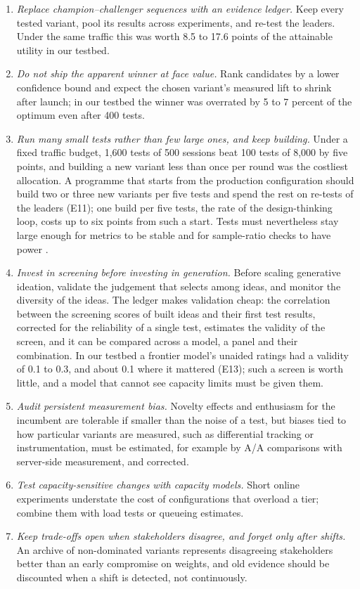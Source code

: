 \documentclass[preprint,12pt,authoryear]{elsarticle}
\theoremstyle{definition}
\begin{document}
\begin{enumerate}[leftmargin=*,itemsep=2pt]
\item \emph{Replace champion--challenger sequences with an evidence ledger.} Keep every tested variant, pool its results across experiments, and re-test the leaders. Under the same traffic this was worth 8.5 to 17.6 points of the attainable utility in our testbed.
\item \emph{Do not ship the apparent winner at face value.} Rank candidates by a lower confidence bound and expect the chosen variant's measured lift to shrink after launch; in our testbed the winner was overrated by 5 to 7 percent of the optimum even after 400 tests.
\item \emph{Run many small tests rather than few large ones, and keep building.} Under a fixed traffic budget, 1,600 tests of 500 sessions beat 100 tests of 8,000 by five points, and building a new variant less than once per round was the costliest allocation. A programme that starts from the production configuration should build two or three new variants per five tests and spend the rest on re-tests of the leaders (E11); one build per five tests, the rate of the design-thinking loop, costs up to six points from such a start. Tests must nevertheless stay large enough for metrics to be stable and for sample-ratio checks to have power \citep{fabijan2019}.
\item \emph{Invest in screening before investing in generation.} Before scaling generative ideation, validate the judgement that selects among ideas, and monitor the diversity of the ideas. The ledger makes validation cheap: the correlation between the screening scores of built ideas and their first test results, corrected for the reliability of a single test, estimates the validity of the screen, and it can be compared across a model, a panel and their combination. In our testbed a frontier model's unaided ratings had a validity of 0.1 to 0.3, and about 0.1 where it mattered (E13); such a screen is worth little, and a model that cannot see capacity limits must be given them.
\item \emph{Audit persistent measurement bias.} Novelty effects and enthusiasm for the incumbent are tolerable if smaller than the noise of a test, but biases tied to how particular variants are measured, such as differential tracking or instrumentation, must be estimated, for example by A/A comparisons with server-side measurement, and corrected.
\item \emph{Test capacity-sensitive changes with capacity models.} Short online experiments understate the cost of configurations that overload a tier; combine them with load tests or queueing estimates.
\item \emph{Keep trade-offs open when stakeholders disagree, and forget only after shifts.} An archive of non-dominated variants represents disagreeing stakeholders better than an early compromise on weights, and old evidence should be discounted when a shift is detected, not continuously.
\end{enumerate}
\end{document}
